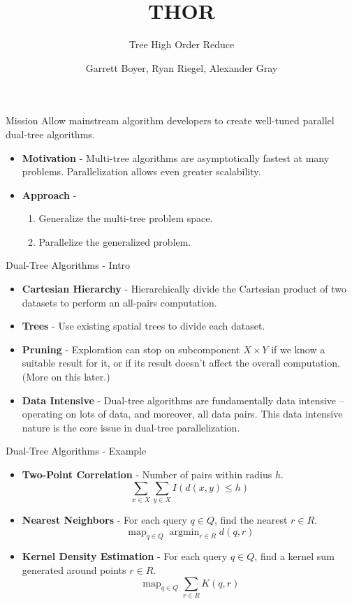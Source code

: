 \documentclass[pdf,colorBG,slideColor]{prosper}
\title{THOR}
\subtitle{Tree High Order Reduce}
\author{Garrett Boyer, Ryan Riegel, Alexander Gray}
\newcommand{\itemt}[1]{\item {\bf #1} -}
\DeclareMathOperator*{\map}{map}
\DeclareMathOperator*{\argmin}{argmin}
\begin{document}
\maketitle

\begin{slide}{Mission}
  Allow mainstream algorithm developers to create well-tuned parallel
  dual-tree algorithms.

  \begin{itemize}
    \itemt{Motivation}
    Multi-tree algorithms are asymptotically fastest at many problems.
    Parallelization allows even greater scalability.
    \itemt{Approach}
    \begin{enumerate}
      \item Generalize the multi-tree problem space.
      \item Parallelize the generalized problem.
    \end{enumerate}
  \end{itemize}
\end{slide}

\begin{slide}{Dual-Tree Algorithms - Intro}
  \begin{itemize}
    \itemt{Cartesian Hierarchy}
    Hierarchically divide the Cartesian product of two
    datasets to perform an all-pairs computation.
    \itemt{Trees}
    Use existing spatial trees to divide each dataset.
    \itemt{Pruning}
    Exploration can stop on subcomponent $X \times Y$ if we know a suitable
    result for it, or if its result doesn't affect the overall computation.
    (More on this later.)
    \itemt{Data Intensive}
    Dual-tree algorithms are fundamentally data intensive -- operating on
    lots of data, and moreover, all data pairs.
    This data intensive nature is the core issue in dual-tree parallelization.
  \end{itemize}
\end{slide}

\begin{slide}{Dual-Tree Algorithms - Example}
  \begin{itemize}
    \itemt{Two-Point Correlation}
    Number of pairs within radius $h$.
    \[\sum_{x \in X} \sum_{y \in X} I(d(x, y) \leq h)\]
    \itemt{Nearest Neighbors}
    For each query $q \in Q$, find the nearest $r \in R$.
    \[\map_{q \in Q} \argmin_{r \in R} d(q,r)\]
    \itemt{Kernel Density Estimation}
    For each query $q \in Q$, find a kernel sum generated around points $r \in R$.
    \[\map_{q \in Q} \sum_{r \in R} K(q, r)\]
  \end{itemize}
\end{slide}
\end{document}
